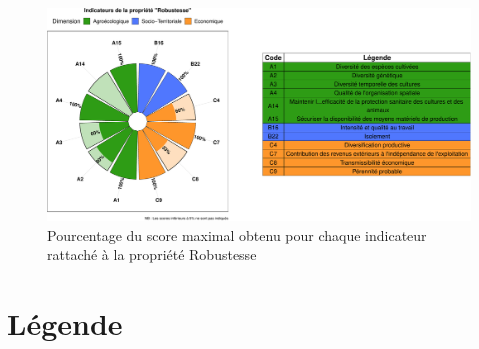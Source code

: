 \documentclass[]{article}
\begin{document}
\begin{figure}[H]

{\centering \includegraphics[width=1\linewidth]{report_files/figure-latex/unnamed-chunk-21-1} 

}

\caption{Pourcentage du score maximal obtenu pour chaque indicateur rattaché à la propriété Robustesse}\label{fig:unnamed-chunk-21}
\end{figure}

\newpage

\hypertarget{luxe9gende}{%
\section{Légende}\label{luxe9gende}}

\footnotesize
\end{document}
